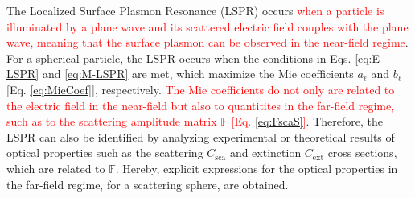 
The Localized Surface Plasmon Resonance (LSPR) occurs \textcolor{red}{when a particle is illuminated by a plane wave and its scattered electric field couples with the plane wave,  meaning that the surface plasmon can be observed in the near-field regime}. For a spherical particle, the LSPR occurs when the conditions in Eqs. \eqref{eq:E-LSPR} and \eqref{eq:M-LSPR} are met, which maximize the Mie coefficients  $a_\ell$ and $b_\ell$ [Eq. \eqref{eq:MieCoef}], respectively. \textcolor{red}{The Mie coefficients do not only are related to the electric field in the near-field but also to quantitites in the far-field regime, such as to the scattering amplitude matrix $\mathbb{F}$ [Eq. \eqref{eq:FscaS}]}. Therefore, the LSPR can also be identified by analyzing experimental or theoretical results of optical properties such as the scattering $C_\text{sca}$ and extinction $C_\text{ext}$ cross sections, which are related to $\mathbb{F}$.  Hereby, explicit expressions for the optical properties in the far-field regime, for a scattering sphere, are obtained.

